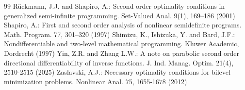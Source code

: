 \documentclass[11pt]{article}
\theoremstyle{definition}
\theoremstyle{remark}
\numberwithin{equation}{section}
\begin{document}
\begin{thebibliography}{99}
Rückmann, J.J. and Shapiro, A.: Second-order optimality conditions in generalized semi-infinite
  programming. Set-Valued Anal. {9}(1), 169–186 (2001)
   Shapiro, A.: First and second order analysis of nonlinear semidefinite programs. Math. Program. {77}, 301–320 (1997)
Shimizu, K., Ishizuka, Y. and Bard, J.F.: Nondifferentiable and two-level mathematical
    programming. Kluwer Academic, Dordrecht (1997)
Yin, Z.R. and   Zhang L.W.: A note on parabolic second order directional differentiability of inverse functions. J. Ind. Manag. Optim.  21(4), 2510-2515 (2025)
Zaslavski, A.J.: Necessary optimality conditions for bilevel minimization problems.
   Nonlinear Anal. {75}, 1655-1678 (2012)
\end{thebibliography}
\end{document}
